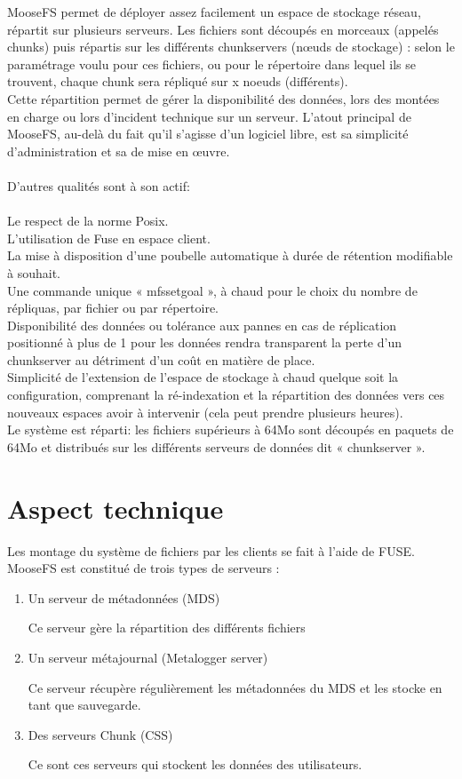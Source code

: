 \documentclass[12pt]{report}
\begin{document}
			MooseFS permet de déployer assez facilement un espace de stockage réseau, répartit sur plusieurs serveurs. 
			Les fichiers sont découpés en morceaux (appelés chunks) puis répartis sur les différents chunkservers (nœuds de stockage) :
			selon le paramétrage voulu pour ces fichiers, ou pour le répertoire dans lequel ils se trouvent,
			chaque chunk sera répliqué sur x noeuds (différents).\\
			Cette répartition permet de gérer la disponibilité des données, lors des montées en charge ou lors d’incident technique
			sur un serveur. L'atout principal de MooseFS, au-delà du fait qu'il s’agisse d’un logiciel libre,
			est sa simplicité d'administration et sa de mise en œuvre.\\\\
			D'autres qualités sont à son actif: \\\\
			Le respect de la norme Posix.\\
			L'utilisation de Fuse en espace client.\\
			La mise à disposition d'une poubelle automatique à durée de rétention modifiable à souhait.\\
			Une commande unique « mfssetgoal », à chaud pour le choix du nombre de répliquas, par fichier ou par répertoire.\\
			Disponibilité des données ou tolérance aux pannes en cas de réplication positionné à plus de 1 pour les données
			rendra transparent la perte d'un chunkserver au détriment d'un coût en matière de place.\\ 
			Simplicité de l'extension de l'espace de stockage à chaud quelque soit la configuration,
			comprenant la ré-indexation et la répartition des données vers ces nouveaux espaces avoir à intervenir
			(cela peut prendre plusieurs heures).  \\
			Le système est réparti: les fichiers supérieurs à 64Mo sont découpés en paquets de 64Mo et distribués
			sur les différents serveurs de données dit « chunkserver ».\\
			\section{Aspect technique}
				
				Les montage du système de fichiers par les clients se fait à l'aide de FUSE.
				MooseFS est constitué de trois types de serveurs :

				\begin{enumerate}
					\item Un serveur de métadonnées (MDS)

					Ce serveur gère la répartition des différents fichiers
					\item Un serveur métajournal (Metalogger server)

					Ce serveur récupère régulièrement les métadonnées du MDS et les stocke en tant que sauvegarde.
					\item Des serveurs Chunk (CSS) %

					Ce sont ces serveurs qui stockent les données des utilisateurs.
				\end{enumerate}
				
\end{document}
